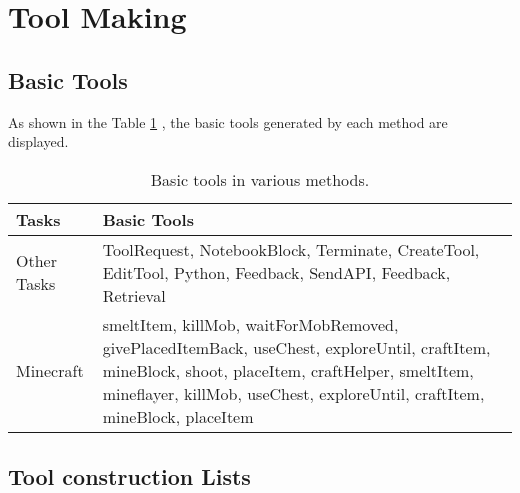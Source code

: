 \section{Tool Making}
\label{app:toolgarph}
\subsection{Basic Tools}
\label{subsec:basic-tools}
As shown in the Table \ref{tab:basictool} , the basic tools generated by each method are displayed.

\begingroup
\begin{table}[H]
\caption{Basic tools in various methods.}
\label{tab:basictool}
\vskip -0.1in
\setlength{\tabcolsep}{10pt} %
\begin{center}
\begin{small}
\begin{sc}
\begin{tabular}{l|p{12cm}}
\toprule
\textnormal{\textbf{Tasks}} & \textnormal{\textbf{Basic Tools}}  \\
\midrule         

\normalfont Other Tasks & \normalfont ToolRequest, NotebookBlock, Terminate, CreateTool, EditTool, Python, Feedback, SendAPI, Feedback, Retrieval \\
\midrule  
\normalfont Minecraft & \normalfont smeltItem, killMob, waitForMobRemoved, givePlacedItemBack, useChest, exploreUntil, craftItem, mineBlock, shoot, placeItem, craftHelper, smeltItem, mineflayer, killMob, useChest, exploreUntil, craftItem, mineBlock, placeItem \\

\bottomrule
\end{tabular}
\end{sc}
\end{small}
\end{center}
\vskip -0.1in
\end{table}
\endgroup


\subsection{Tool construction Lists}
\label{subsec:tool construction}

